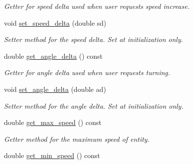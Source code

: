 \begin{DoxyCompactItemize}
\begin{DoxyCompactList}\small\item\em Getter for speed delta used when user requests speed increase. \end{DoxyCompactList}\item 
void \hyperlink{classMotionHandler_a908b330346b3fe969684106bd5c7619d}{set\+\_\+speed\+\_\+delta} (double sd)\hypertarget{classMotionHandler_a908b330346b3fe969684106bd5c7619d}{}\label{classMotionHandler_a908b330346b3fe969684106bd5c7619d}

\begin{DoxyCompactList}\small\item\em Setter method for the speed delta. Set at initialization only. \end{DoxyCompactList}\item 
double \hyperlink{classMotionHandler_a67c945d11edc741af5c71c3596ead557}{get\+\_\+angle\+\_\+delta} () const \hypertarget{classMotionHandler_a67c945d11edc741af5c71c3596ead557}{}\label{classMotionHandler_a67c945d11edc741af5c71c3596ead557}

\begin{DoxyCompactList}\small\item\em Getter for angle delta used when user requests turning. \end{DoxyCompactList}\item 
void \hyperlink{classMotionHandler_a8c2811ddf1a0f077fec829c460009286}{set\+\_\+angle\+\_\+delta} (double ad)\hypertarget{classMotionHandler_a8c2811ddf1a0f077fec829c460009286}{}\label{classMotionHandler_a8c2811ddf1a0f077fec829c460009286}

\begin{DoxyCompactList}\small\item\em Setter method for the angle delta. Set at initialization only. \end{DoxyCompactList}\item 
double \hyperlink{classMotionHandler_a4024f3b5562b5e49bfaeab9f82c0762b}{get\+\_\+max\+\_\+speed} () const \hypertarget{classMotionHandler_a4024f3b5562b5e49bfaeab9f82c0762b}{}\label{classMotionHandler_a4024f3b5562b5e49bfaeab9f82c0762b}

\begin{DoxyCompactList}\small\item\em Getter method for the maximum speed of entity. \end{DoxyCompactList}\item 
double \hyperlink{classMotionHandler_a79f91588f2b5b4b17dcbb5e09bf88d64}{get\+\_\+min\+\_\+speed} () const \hypertarget{classMotionHandler_a79f91588f2b5b4b17dcbb5e09bf88d64}{}\label{classMotionHandler_a79f91588f2b5b4b17dcbb5e09bf88d64}


\end{DoxyCompactItemize}
